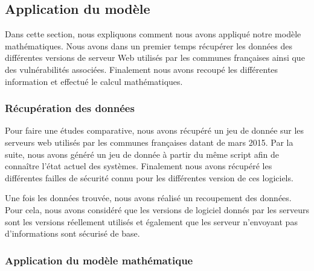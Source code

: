 \subsection{Application du modèle}
Dans cette section, nous expliquons comment nous avons appliqué notre modèle mathématiques.
Nous avons dans un premier temps récupérer les données des différentes versions de serveur Web utilisés par les communes françaises ainsi que des vulnérabilités associées.
Finalement nous avons recoupé les différentes information et effectué le calcul mathématiques.

\subsubsection{Récupération des données}
Pour faire une études comparative, nous avons récupéré un jeu de donnée sur les serveurs web utilisés par les communes françaises datant de mars 2015.
Par la suite, nous avons généré un jeu de donnée à partir du même script afin de connaître l'état actuel des systèmes.
Finalement nous avons récupéré les différentes failles de sécurité connu pour les différentes version de ces logiciels.

Une fois les données trouvée, nous avons réalisé un recoupement des données.
Pour cela, nous avons considéré que les versions de logiciel donnés par les serveurs sont les versions réellement utilisés et également que les serveur n'envoyant pas d'informations sont sécurisé de base.


\subsubsection{Application du modèle mathématique}


